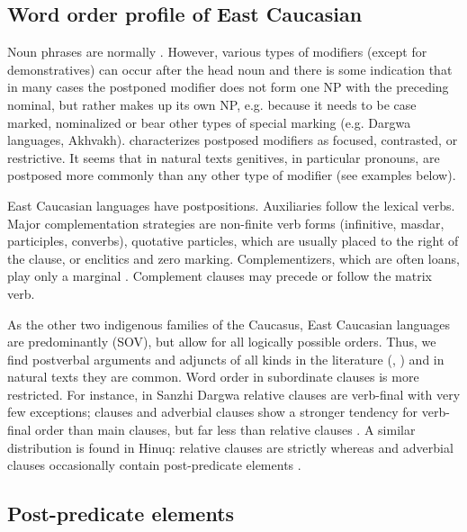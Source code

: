 \documentclass[output=paper,colorlinks,citecolor=brown,draftmode]{langscibook}
\begin{document}
\subsection{Word order profile of East Caucasian}\label{EC:ss:3.1}

Noun phrases are normally  \citep{ganenkov_nakh-dagestanian_2021}. However, various types of modifiers (except for demonstratives) can occur after the head noun and there is some indication that in many cases the postponed modifier does not form one NP with the preceding nominal, but rather makes up its own NP, e.g. because it needs to be case marked, nominalized or bear other types of special marking (e.g. Dargwa languages, Akhvakh). \citet[274]{testelets_wordDaghestanian_1998} characterizes postposed modifiers as focused, contrasted, or restrictive. It seems that in natural texts genitives, in particular  pronouns, are postposed more commonly than any other type of modifier (see examples below).

East Caucasian languages have postpositions. Auxiliaries follow the lexical verbs. Major complementation strategies are non-finite verb forms (infinitive, masdar, participles, converbs), quotative particles, which are usually placed to the right of the clause, or enclitics and zero marking. Complementizers, which are often loans, play only a marginal . Complement clauses may precede or follow the matrix verb.

As the other two indigenous families of the Caucasus, East Caucasian languages are predominantly  (SOV), but allow for all logically possible orders. Thus, we find postverbal arguments and adjuncts of all kinds in the literature (\citealt{testelets_wordDaghestanian_1998}, \citealt{van_den_berg_east_2005}) and in natural texts they are common. Word order in subordinate clauses is more restricted. For instance, in Sanzhi Dargwa relative clauses are verb-final with very few exceptions;  clauses and adverbial clauses show a stronger tendency for verb-final order than main clauses, but far less than relative clauses \citep{forker_grammar_2020}. A similar distribution is found in Hinuq: relative clauses are strictly  whereas  and adverbial clauses occasionally contain post-predicate elements \citep{forker_grammar_2013}. 

\subsection{Post-predicate elements}\label{EC:ss:3.2}
\end{document}
